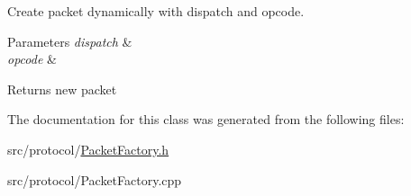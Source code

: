 Create packet dynamically with dispatch and opcode. 


\begin{DoxyParams}{Parameters}
{\em dispatch} & \\
\hline
{\em opcode} & \\
\hline
\end{DoxyParams}
\begin{DoxyReturn}{Returns}
new packet 
\end{DoxyReturn}


The documentation for this class was generated from the following files\-:\begin{DoxyCompactItemize}
\item 
src/protocol/\hyperlink{_packet_factory_8h}{Packet\-Factory.\-h}\item 
src/protocol/Packet\-Factory.\-cpp\end{DoxyCompactItemize}
